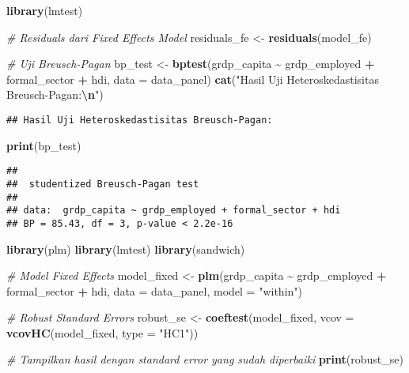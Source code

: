 \documentclass[
]{article}
\newenvironment{Shaded}{\begin{snugshade}}{\end{snugshade}}
\newcommand{\AttributeTok}[1]{\textcolor[rgb]{0.13,0.29,0.53}{#1}}
\newcommand{\CommentTok}[1]{\textcolor[rgb]{0.56,0.35,0.01}{\textit{#1}}}
\newcommand{\FunctionTok}[1]{\textcolor[rgb]{0.13,0.29,0.53}{\textbf{#1}}}
\newcommand{\NormalTok}[1]{#1}
\newcommand{\OtherTok}[1]{\textcolor[rgb]{0.56,0.35,0.01}{#1}}
\newcommand{\SpecialCharTok}[1]{\textcolor[rgb]{0.81,0.36,0.00}{\textbf{#1}}}
\newcommand{\StringTok}[1]{\textcolor[rgb]{0.31,0.60,0.02}{#1}}
\begin{document}
\begin{Shaded}
\begin{Highlighting}[]
\FunctionTok{library}\NormalTok{(lmtest)}

\CommentTok{\# Residuals dari Fixed Effects Model}
\NormalTok{residuals\_fe }\OtherTok{\textless{}{-}} \FunctionTok{residuals}\NormalTok{(model\_fe)}

\CommentTok{\# Uji Breusch{-}Pagan}
\NormalTok{bp\_test }\OtherTok{\textless{}{-}} \FunctionTok{bptest}\NormalTok{(grdp\_capita }\SpecialCharTok{\textasciitilde{}}\NormalTok{ grdp\_employed }\SpecialCharTok{+}\NormalTok{ formal\_sector }\SpecialCharTok{+}\NormalTok{ hdi, }\AttributeTok{data =}\NormalTok{ data\_panel)}
\FunctionTok{cat}\NormalTok{(}\StringTok{"Hasil Uji Heteroskedastisitas Breusch{-}Pagan:}\SpecialCharTok{\textbackslash{}n}\StringTok{"}\NormalTok{)}
\end{Highlighting}
\end{Shaded}

\begin{verbatim}
## Hasil Uji Heteroskedastisitas Breusch-Pagan:
\end{verbatim}

\begin{Shaded}
\begin{Highlighting}[]
\FunctionTok{print}\NormalTok{(bp\_test)}
\end{Highlighting}
\end{Shaded}

\begin{verbatim}
## 
##  studentized Breusch-Pagan test
## 
## data:  grdp_capita ~ grdp_employed + formal_sector + hdi
## BP = 85.43, df = 3, p-value < 2.2e-16
\end{verbatim}

\begin{Shaded}
\begin{Highlighting}[]
\FunctionTok{library}\NormalTok{(plm)}
\FunctionTok{library}\NormalTok{(lmtest)}
\FunctionTok{library}\NormalTok{(sandwich)}

\CommentTok{\# Model Fixed Effects}
\NormalTok{model\_fixed }\OtherTok{\textless{}{-}} \FunctionTok{plm}\NormalTok{(grdp\_capita }\SpecialCharTok{\textasciitilde{}}\NormalTok{ grdp\_employed }\SpecialCharTok{+}\NormalTok{ formal\_sector }\SpecialCharTok{+}\NormalTok{ hdi, }
                   \AttributeTok{data =}\NormalTok{ data\_panel, }\AttributeTok{model =} \StringTok{"within"}\NormalTok{)}

\CommentTok{\# Robust Standard Errors}
\NormalTok{robust\_se }\OtherTok{\textless{}{-}} \FunctionTok{coeftest}\NormalTok{(model\_fixed, }\AttributeTok{vcov =} \FunctionTok{vcovHC}\NormalTok{(model\_fixed, }\AttributeTok{type =} \StringTok{"HC1"}\NormalTok{))}

\CommentTok{\# Tampilkan hasil dengan standard error yang sudah diperbaiki}
\FunctionTok{print}\NormalTok{(robust\_se)}
\end{Highlighting}
\end{Shaded}
\end{document}
